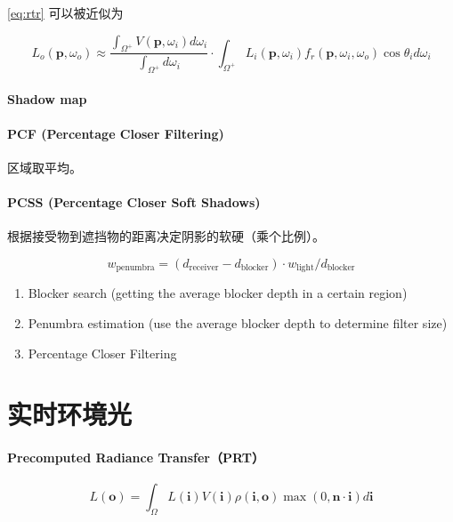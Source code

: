 \documentclass[]{ctexart}
\begin{document}
\eqref{eq:rtr} 可以被近似为

\begin{equation}
    L_o(\mathbf{p},\omega_o)\approx\frac{\int_{\Omega^+}V(\mathbf{p},\omega_i)d\omega_i}{\int_{\Omega^+}d\omega_i}\cdot\int_{\Omega^+}L_i(\mathbf{p},\omega_i)f_r(\mathbf{p},\omega_i,\omega_o)\cos\theta_i d\omega_i
\end{equation}

\paragraph{Shadow map}

\paragraph{PCF (Percentage Closer Filtering)}

区域取平均。 

\paragraph{PCSS (Percentage Closer Soft Shadows)} 根据接受物到遮挡物的距离决定阴影的软硬（乘个比例）。

\begin{equation}
    w_\text{penumbra} = (d_\text{receiver} - d_\text{blocker}) \cdot w_\text{light} / d_\text{blocker}
\end{equation}

\begin{enumerate}
    \item Blocker search (getting the average blocker depth in a certain region)
    \item Penumbra estimation (use the average blocker depth to determine filter size)
    \item Percentage Closer Filtering
\end{enumerate}

\section{实时环境光}
\paragraph{Precomputed Radiance Transfer（PRT）}

\begin{equation}
    L(\mathbf{o}) = \int_\Omega L(\mathbf{i}) V(\mathbf{i})\rho(\mathbf{i},\mathbf{o})\max(0,\mathbf{n}\cdot\mathbf{i})d\mathbf{i}
\end{equation}
\end{document}
